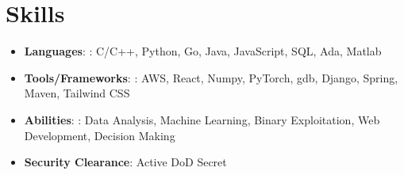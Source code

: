 \documentclass[letterpaper,9pt]{article}
\newcommand{\resumeItem}[2]{
  \item\small{
    \textbf{#1}{: #2 \vspace{-2pt}}
  }
}
\newcommand{\resumeSubItem}[2]{\resumeItem{#1}{#2}\vspace{-4pt}}
\newcommand{\resumeSubHeadingListStart}{\begin{itemize}[leftmargin=*, label={}]}
\newcommand{\resumeSubHeadingListEnd}{\end{itemize}}
\begin{document}
%
\section{Skills}
 \resumeSubHeadingListStart
   \resumeSubItem{Languages}{: C/C++, Python, Go, Java, JavaScript, SQL, Ada, Matlab}
   \resumeSubItem{Tools/Frameworks}{: AWS, React, Numpy, PyTorch, gdb, Django, Spring, Maven, Tailwind CSS}
   \resumeSubItem{Abilities}{: Data Analysis, Machine Learning, Binary Exploitation, Web Development, Decision Making}
   \resumeSubItem{Security Clearance}{Active DoD Secret}
 \resumeSubHeadingListEnd


\end{document}
